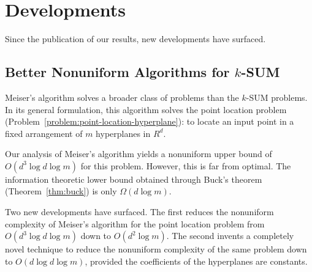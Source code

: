 \chapter{Developments}%
\label{chapter:developments}

Since the publication of our results, new developments have surfaced.

\section{Better Nonuniform Algorithms for \texorpdfstring{\(k\)-SUM}{k-SUM}}%
\label{sec:developments:ksum-algorithm}

Meiser's algorithm solves a broader class of problems than the \(k\)-SUM
problems. In its general formulation, this algorithm solves
the point location problem (Problem~\ref{problem:point-location-hyperplane}):
to locate an input point in a fixed arrangement of $m$ hyperplanes in $R^d$.

Our analysis of Meiser's algorithm yields a nonuniform upper bound of \(O(d^3 \log
d \log m)\) for this problem. However, this is far from optimal.
The information theoretic lower bound obtained through
Buck's theorem (Theorem~\ref{thm:buck}) is only \(\Omega(d \log m)\).






Two new developments have surfaced.
%
The first reduces the nonuniform complexity of Meiser's algorithm for the point
location problem from
\(O(d^3 \log d \log m)\) down to \(O(d^2 \log m)\).
%
The second invents a completely novel technique to reduce the nonuniform
complexity of the same problem down to \(O(d \log d \log m)\), provided the
coefficients of the hyperplanes are constants.

